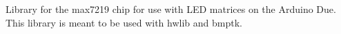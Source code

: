 Library for the max7219 chip for use with L\+ED matrices on the Arduino Due. This library is meant to be used with hwlib and bmptk. 